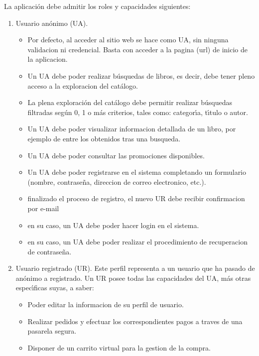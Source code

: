 \documentclass[a4paper]{report}
\begin{document}
            La aplicaci\'on debe admitir los roles y capacidades siguientes:
            \begin{enumerate}
                \item Usuario an\'onimo (UA).
                \begin{itemize}
                    \item Por defecto, al acceder al sitio web se hace como UA, sin ninguna validacion ni credencial. Basta con acceder a la pagina (url) de inicio de la aplicacion.
                    \item Un UA debe poder realizar b\'usquedas de libros, es decir, debe tener pleno acceso a la exploracion del cat\'alogo.
                    \item La plena exploraci\'on del cat\'alogo debe permitir realizar b\'usque\-das filtradas seg\'un 0, 1 o m\'as criterios, tales como: categor\'\i{}a, t\'\i{}tulo o autor.
                    \item Un UA debe poder visualizar informacion detallada de un libro, por ejemplo de entre los obtenidos tras una busqueda.
                    \item Un UA debe poder consultar las promociones disponibles.
                    \item Un UA debe poder registrarse en el sistema completando un formulario (nombre, contrase\~na, direccion de correo electronico, etc.).
                    \item finalizado el proceso de registro, el nuevo UR debe recibir confirmacion por e-mail
                    \item en su caso, un UA debe poder hacer login en el sistema.
                    \item en su caso, un UA debe poder realizar el procedimiento de recuperacion de contrase\~na.
                \end{itemize}
                \item Usuario registrado (UR). Este perfil representa a un usuario que ha pasado de an\'onimo a registrado. Un UR posee todas las capacidades del UA, m\'as otras espec\'\i{}ficas suyas, a saber:
                \begin{itemize}
                    \item Poder editar la informacion de su perfil de usuario.
                    \item Realizar pedidos y efectuar los correspondientes pagos a traves de una pasarela segura.
                    \item Disponer de un carrito virtual para la gestion de la compra.

\end{itemize}
\end{enumerate}
\end{document}
